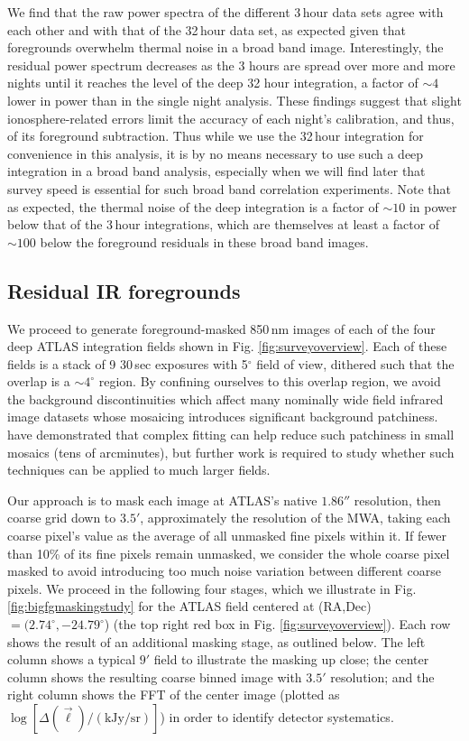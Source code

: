 \documentclass[numberedappendix]{emulateapj}
\begin{document}
We find that the raw power spectra of the different 3\,hour data sets agree with each other and with that of the 32\,hour data set, as expected given that foregrounds overwhelm thermal noise in a broad band image. Interestingly, the residual power spectrum decreases as the 3 hours are spread over more and more nights until it reaches the level of the deep 32 hour integration, a factor of $\sim4$ lower in power than in the single night analysis. These findings suggest that slight ionosphere-related errors limit the accuracy of each night's calibration, and thus, of its foreground subtraction. Thus while we use the 32\,hour integration for convenience in this analysis, it is by no means necessary to use such a deep integration in a broad band analysis, especially when we will find later that survey speed is essential for such broad band correlation experiments. Note that as expected, the thermal noise of the deep integration is a factor of $\sim10$ in power below that of the 3\,hour integrations, which are themselves at least a factor of $\sim100$ below the foreground residuals in these broad band images.

\subsection{Residual IR foregrounds}
\label{sec:resirfg}

We proceed to generate foreground-masked 850\,nm images of each of the four deep ATLAS integration fields shown in Fig. \ref{fig:surveyoverview}. Each of these fields is a stack of 9 30\,sec exposures with 5$^\circ$ field of view, dithered such that the overlap is a $\sim4^\circ$ region. By confining ourselves to this overlap region, we avoid the background discontinuities which affect many nominally wide field infrared image datasets whose mosaicing introduces significant background patchiness. \citet{mw15} have demonstrated that complex fitting \citep{fixen00} can help reduce such patchiness in small mosaics (tens of arcminutes), but further work is required to study whether such techniques can be applied to much larger fields.

Our approach is to mask each image at ATLAS's native $1.86''$ resolution, then coarse grid down to $3.5'$, approximately the resolution of the MWA, taking each coarse pixel's value as the average of all unmasked fine pixels within it. If fewer than 10\% of its fine pixels remain unmasked, we consider the whole coarse pixel masked to avoid introducing too much noise variation between different coarse pixels. We proceed in the following four stages, which we illustrate in Fig. \ref{fig:bigfgmaskingstudy} for the ATLAS field centered at (RA,Dec)$=(2.74^\circ, -24.79^\circ$) (the top right red box in Fig. \ref{fig:surveyoverview}). Each row shows the result of an additional masking stage, as outlined below. The left column shows a typical $9'$ field to illustrate the masking up close; the center column shows the resulting coarse binned image with $3.5'$ resolution; and the right column shows the FFT of the center image (plotted as $\log[\Delta(\vec{\ell})/(\text{kJy/sr})]$) in order to identify detector systematics. 
\end{document}
